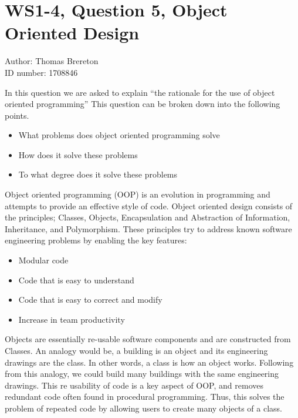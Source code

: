 \documentclass[11pt]{article} %
\begin{document}

\section*{WS1-4, Question 5, Object Oriented Design} %
Author: Thomas Brereton\\
ID number: 1708846
\newline



In this question we are asked to explain ``the rationale for the use of object oriented programming'' This question can be broken down into the following points.

\begin{itemize}
	\item What problems does object oriented programming solve
	\item How does it solve these problems
	\item To what degree does it solve these problems
\end{itemize}

Object oriented programming (OOP) is an evolution in programming and attempts to provide an effective style of code. Object oriented design consists of the principles;  Classes, Objects, Encapsulation and Abstraction of Information, Inheritance, and Polymorphism. These principles try to address known software engineering problems by enabling the key features\cite{deitel:1}:

\begin{itemize}
	\item Modular code
	\item Code that is easy to understand
	\item Code that is easy to correct and modify
	\item Increase in team productivity
\end{itemize}

Objects are essentially re-usable software components and are constructed from Classes. An analogy would be, a building is an object and its engineering drawings are the class. In other words, a class is how an object works. Following from this analogy, we could build many buildings with the same engineering drawings. This re usability of code is a key aspect of OOP, and removes redundant code often found in procedural programming. Thus, this solves the problem of repeated code by allowing users to create many objects of a class. 
\end{document}
